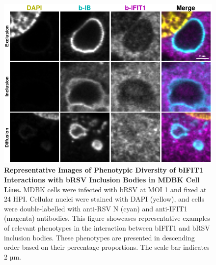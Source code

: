 \begin{figure}
    \centering
    \includegraphics[width=1\linewidth]{08. Chapter 3/Figs/02. Infection/01. IFIT1/09. mdbk i1.pdf}
    \caption[Representative Images of Phenotypic Diversity of bIFIT1 Interactions with bRSV Inclusion Bodies in MDBK Cell Line.]{\textbf{Representative Images of Phenotypic Diversity of bIFIT1 Interactions with bRSV Inclusion Bodies in MDBK Cell Line.} MDBK cells were infected with bRSV at MOI 1 and fixed at 24 HPI. Cellular nuclei were stained with DAPI (yellow), and cells were double-labelled with anti-RSV N (cyan) and anti-IFIT1 (magenta) antibodies. This figure showcases representative examples of relevant phenotypes in the interaction between bIFIT1 and bRSV inclusion bodies. These phenotypes are presented in descending order based on their percentage proportions. The scale bar indicates 2 µm.}
    \label{fig:Representative Images of Phenotypic Diversity of bIFIT1 Interactions with bRSV Inclusion Bodies in MDBK Cell Line}
\end{figure}

